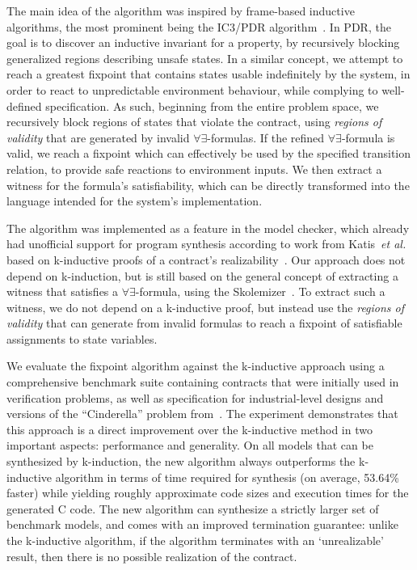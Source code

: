 The main idea of the algorithm was inspired by frame-based inductive algorithms, the most prominent being the IC3/PDR algorithm~\cite{bradley2011sat,een2011efficient}. In PDR, the goal is to discover an inductive invariant for a property, by recursively blocking generalized regions describing unsafe states. In a similar concept, we attempt
to reach a greatest fixpoint that contains states usable indefinitely by the
system, in order to react to unpredictable environment behaviour, while
complying to well-defined specification. As such, beginning from the entire
problem space, we recursively block regions of states that violate the contract, using \textit{regions of validity} that are
generated by invalid $\forall\exists$-formulas. If the refined
$\forall\exists$-formula is valid, we reach a fixpoint which can effectively be used by the specified transition relation, to
provide safe reactions to environment inputs. We then extract a witness for the
formula's satisfiability, which can be directly transformed into the
language intended for the system's implementation.

The algorithm was implemented as a feature in the \jkind model checker, which
already had unofficial support for program synthesis according to work from
Katis~\textit{et al.} based on k-inductive proofs of a contract's
realizability~\cite{gacek2015towards,katis2016towards,katis2016synthesis}.
Our approach does not depend on k-induction, but is still based on the general
concept of extracting a witness that satisfies a $\forall\exists$-formula, using
the \aeval Skolemizer~\cite{fedyukovich2015automated}. To extract such a witness, we do not depend on a k-inductive proof, but instead use the \textit{regions of validity} that \aeval can generate from invalid formulas to reach a fixpoint of satisfiable assignments to state variables.

We evaluate the fixpoint algorithm against the k-inductive approach using a comprehensive benchmark suite containing contracts that were initially used in verification problems, as well as specification for industrial-level designs and versions of the ``Cinderella'' problem from~\cite{beyene2014constraint}.  The experiment demonstrates that this approach is a direct improvement over the k-inductive method in two important aspects: performance and generality.  On all models that can be synthesized by k-induction, the new algorithm always outperforms the k-inductive algorithm in terms of time required for synthesis (on average, 53.64\% faster) while yielding roughly approximate code sizes and execution times for the generated C code.  The new algorithm can synthesize a strictly larger set of benchmark models, and comes with an improved termination guarantee: unlike the k-inductive algorithm, if the algorithm terminates with an `unrealizable' result, then there is no possible realization of the contract.

